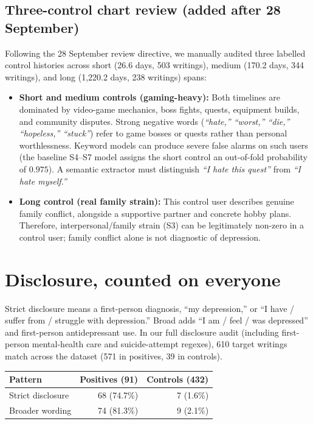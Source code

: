 \documentclass[11pt,a4paper]{article}
\begin{document}
\subsection{Three-control chart review (added after 28 September)}
Following the 28 September review directive, we manually audited three labelled control histories across short (26.6 days, 503 writings), medium (170.2 days, 344 writings), and long (1,220.2 days, 238 writings) spans:
\begin{itemize}[nosep]
\item \textbf{Short and medium controls (gaming-heavy):} Both timelines are dominated by video-game mechanics, boss fights, quests, equipment builds, and community disputes. Strong negative words (\emph{``hate,'' ``worst,'' ``die,'' ``hopeless,'' ``stuck''}) refer to game bosses or quests rather than personal worthlessness. Keyword models can produce severe false alarms on such users (the baseline S4--S7 model assigns the short control an out-of-fold probability of $0.975$). A semantic extractor must distinguish \emph{``I hate this quest''} from \emph{``I hate myself.''}
\item \textbf{Long control (real family strain):} This control user describes genuine family conflict, alongside a supportive partner and concrete hobby plans. Therefore, interpersonal/family strain (S3) can be legitimately non-zero in a control user; family conflict alone is not diagnostic of depression.
\end{itemize}

\section{Disclosure, counted on everyone}
Strict disclosure means a first-person diagnosis, ``my depression,'' or ``I have / suffer from / struggle with depression.'' Broad adds ``I am / feel / was depressed'' and first-person antidepressant use. In our full disclosure audit (including first-person mental-health care and suicide-attempt regexes), 610 target writings match across the dataset (571 in positives, 39 in controls).

\begin{center}
\begin{tabular}{lrr}
\toprule
\textbf{Pattern} & \textbf{Positives (91)} & \textbf{Controls (432)} \\
\midrule
Strict disclosure & 68 (74.7\%) & 7 (1.6\%) \\
Broader wording & 74 (81.3\%) & 9 (2.1\%) \\
\bottomrule
\end{tabular}
\end{center}
\end{document}
